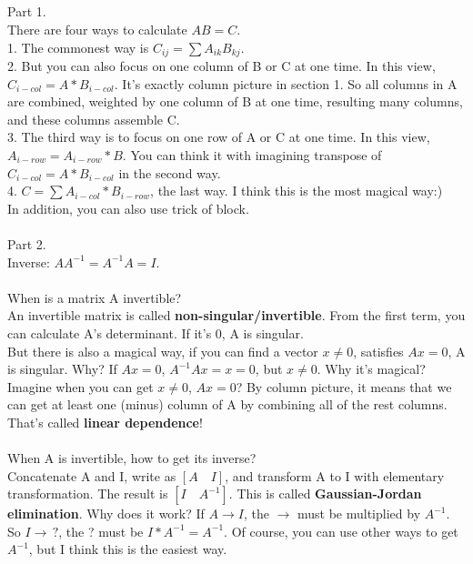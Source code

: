 \documentclass{article}
\begin{document}
\begin{spacing}{1.5}
\section{}
Part 1. \\
There are four ways to calculate $AB=C$. \\
1. The commonest way is $C_{ij} = \sum A_{ik}B_{kj}$. \\
2. But you can also focus on one column of B or C at one time. In this view, $C_{i-col} = A*B_{i-col}$. It's exactly column picture in section 1. So all columns in A are combined, weighted by one column of B at one time, resulting many columns, and these columns assemble C. \\
3. The third way is to focus on one row of A or C at one time. In this view, $A_{i-row} = A_{i-row} * B$. You can think it with imagining transpose of $C_{i-col} = A*B_{i-col}$ in the second way. \\
4. $C = \sum A_{i-col}*B_{i-row}$, the last way. I think this is the most magical way:) \\
In addition, you can also use trick of block.\\ 
\\ Part 2. \\
Inverse: $AA^{-1}=A^{-1}A=I$. \\
\\ When is a matrix A invertible? \\
An invertible matrix is called {\bfseries non-singular/invertible}. From the first term, you can calculate A's determinant. If it's 0, A is singular. \\
But there is also a magical way, if you can find a vector $x \neq 0$, satisfies $Ax=0$, A is singular. Why? If $Ax=0$, $A^{-1}Ax=x=0$, but $x \neq 0$. Why it's magical? Imagine when you can get $x \neq 0$, $Ax=0$? By column picture, it means that we can get at least one (minus) column of A by combining all of the rest columns. That's called {\bfseries linear dependence}! \\ 
\\ When A is invertible, how to get its inverse? \\
Concatenate A and I, write as $[A \quad I]$, and transform A to I with elementary transformation. The result is $[I \quad A^{-1}]$. This is called {\bfseries Gaussian-Jordan elimination}. Why does it work? If $A \rightarrow I$, the $\rightarrow$ must be multiplied by $A^{-1}$. So $I \rightarrow \, ?$, the ? must be $I*A^{-1}=A^{-1}$. Of course, you can use other ways to get $A^{-1}$, but I think this is the easiest way.



\end{spacing}
\end{document}
